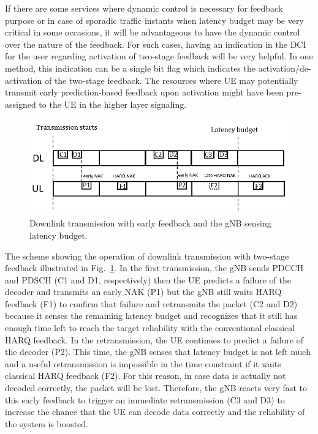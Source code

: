 \documentclass[conference]{IEEEtran}
\begin{document}
If there are some services where dynamic control is necessary for feedback purpose or in case of sporadic traffic instants when latency budget may be very critical in some occasions, it will be advantageous to have the dynamic control over the nature of the feedback. For such cases, having an indication in the DCI for the user regarding activation of two-stage feedback will be very helpful. In one method, this indication can be a single bit flag which indicates the activation/de-activation of the two-stage feedback. The resources where UE may potentially transmit early prediction-based feedback upon activation might have been pre-assigned to the UE in the higher layer signaling.

\begin{figure}[htbp]
\centerline{\includegraphics[scale=0.45]{fig4.png}}
\caption{Downlink transmission with early feedback and the gNB sensing latency budget.}
\label{fig4}
\end{figure}

The scheme showing the operation of downlink transmission with two-stage feedback illustrated in Fig.~\ref{fig4}. In the first transmission, the gNB sends PDCCH and PDSCH (C1 and D1, respectively) then the UE predicts a failure of the decoder and transmits an early NAK (P1) but the gNB still waits HARQ feedback (F1) to confirm that failure and retransmits the packet (C2 and D2) because it senses the remaining latency budget and recognizes that it still has enough time left to reach the target reliability with the conventional classical HARQ feedback. In the retransmission, the UE continues to predict a failure of the decoder (P2). This time, the gNB senses that latency budget is not left much and a useful retransmission is impossible in the time constraint if it waits classical HARQ feedback (F2). For this reason, in case data is actually not decoded correctly, the packet will be lost. Therefore, the gNB reacts very fast to this early feedback to trigger an immediate retransmission (C3 and D3) to increase the chance that the UE can decode data correctly and the reliability of the system is boosted.
\end{document}

